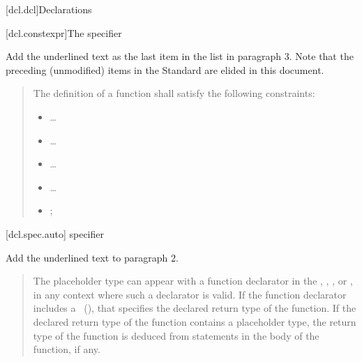 
\setcounter{chapter}{6}
[dcl.dcl]{Declarations}

\setcounter{section}{1}
\setcounter{subsection}{4}
[dcl.constexpr]{The  specifier}%

Add the underlined text as the last item in the list in paragraph 3. Note that
the preceding (unmodified) items in the \Cpp Standard are elided in this
document.

\begin{quote}
  \setcounter{Paras}{2}
\pnum
{}
The definition of a  function shall satisfy the following
constraints:

\begin{itemize}
  \item \ldots
  \item \ldots
  \item \ldots
  \item \ldots
  \item {};
\end{itemize}
\end{quote}

%
%  
%      

\setcounter{section}{1}
\setcounter{subsection}{6}
\setcounter{subsubsection}{3}
[dcl.spec.auto]{ specifier}

Add the underlined text to paragraph 2.

\begin{quote}
\setcounter{Paras}{1}
\pnum
The placeholder type can appear with a function declarator in the
, ,
, or ,
in any context where such a declarator is valid. If the function declarator
includes a ~(), that specifies
the declared return type of the function. If the declared return type of the
function contains a placeholder type, the return type of the function is
deduced from  statements  in the body of the function, if any.
\end{quote}

